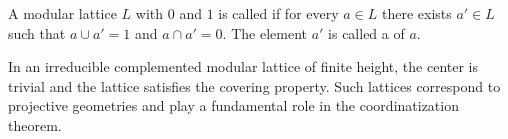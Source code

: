 A modular lattice $L$ with $0$ and $1$ is called  if for every $a \in L$ there exists $a' \in L$ such that $a \cup a' = 1$ and $a \cap a' = 0$. The element $a'$ is called a  of $a$.

In an irreducible complemented modular lattice of finite height, the center is trivial and the lattice satisfies the covering property. Such lattices correspond to projective geometries and play a fundamental role in the coordinatization theorem.
